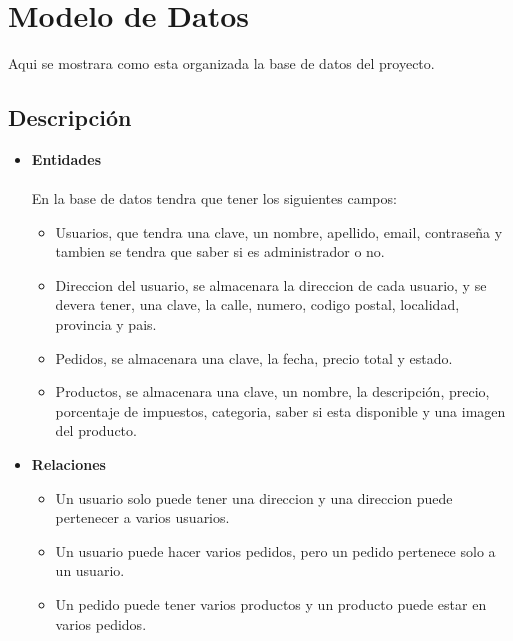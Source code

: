 \documentclass{article}
\begin{document}
\section{Modelo de Datos}
\quad Aqui se mostrara como esta organizada la base de datos del proyecto.
\subsection{Descripción}
\begin{itemize}
    \item \textbf{Entidades} \\\\
En la base de datos tendra que tener los siguientes campos:
\begin{itemize}
    \item Usuarios, que tendra una clave, un nombre, apellido, email, contraseña y tambien se tendra que saber si es administrador o no.
    \item Direccion del usuario, se almacenara la direccion de cada usuario, y se devera tener, una clave, la calle, numero, codigo postal, localidad, provincia y pais.
    \item Pedidos, se almacenara una clave, la fecha, precio total y estado. 
    \item Productos, se almacenara una clave, un nombre, la descripción, precio, porcentaje de impuestos, categoria, saber si esta disponible y una imagen del producto.
\end{itemize}
\item \textbf{Relaciones} 
\begin{itemize}
    \item Un usuario solo puede tener una direccion y una direccion puede pertenecer a varios usuarios. 
    \item Un usuario puede hacer varios pedidos, pero un pedido pertenece solo a un usuario.
    \item Un pedido puede tener varios productos y un producto puede estar en varios pedidos.
\end{itemize}
\end{itemize}
\end{document}
